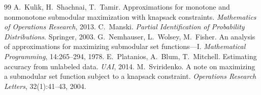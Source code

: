 \documentclass[11pt]{article}
\theoremstyle{definition}
\theoremstyle{remark}
\begin{document}
\begin{thebibliography}{99}
 A.~Kulik, H.~Shachnai, T.~Tamir. Approximations for monotone and nonmonotone submodular maximization with knapsack constraints. \emph{Mathematics of Operations Research}, 2013.
 C.~Manski. \emph{Partial Identification of Probability Distributions}. Springer, 2003.
 G.~Nemhauser, L.~Wolsey, M.~Fisher. An analysis of approximations for maximizing submodular set functions---I. \emph{Mathematical Programming}, 14:265--294, 1978.
 E.~Platanios, A.~Blum, T.~Mitchell. Estimating accuracy from unlabeled data. \emph{UAI}, 2014.
 M.~Sviridenko. A note on maximizing a submodular set function subject to a knapsack constraint. \emph{Operations Research Letters}, 32(1):41--43, 2004.
\end{thebibliography}
\end{document}
